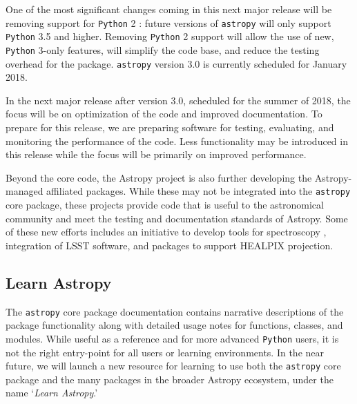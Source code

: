 \documentclass[modern]{aastex61}
\newcommand{\package}[1]{\texttt{#1}\xspace}
\newcommand{\python}{\package{Python}}
\newcommand{\astropy}{Astropy\xspace}
\newcommand{\astropypkg}{\package{astropy}}
\newcommand{\inlinecomment}[2]{\todo[inline]{#1: #2}\xspace}
\begin{document}
One of the most significant changes coming in this next major release will be
removing support for \python 2 \citep{ape10}: future versions of \astropypkg
will only support \python 3.5 and higher.
Removing \python 2 support will allow the use of new, \python 3-only features,
will simplify the code base, and reduce the testing overhead for the package.
\astropypkg version 3.0 is currently scheduled for January 2018.

In the next major release after version 3.0, scheduled for the summer of
2018, the focus will be on optimization of the code and improved
documentation.
To prepare for this release, we are preparing software for testing, evaluating,
and monitoring the performance of the code.
Less functionality may be introduced in this release while the focus will be
primarily on improved performance.

Beyond the core code, the \astropy project is also further developing the
\astropy-managed affiliated packages.
While these may not be integrated into the \astropypkg core package, these
projects provide code that is useful to the astronomical community and meet the
testing and documentation standards of \astropy.
Some of these new efforts includes an initiative to develop tools for
spectroscopy \citep[\package{specutils}, \package{specreduc}, \package{specviz}]
{ape13}, integration of LSST software, and packages to support HEALPIX
projection. %

\subsection{Learn Astropy}

The \astropypkg core package documentation contains narrative descriptions of
the package functionality along with detailed usage notes for functions,
classes, and modules.
While useful as a reference and for more advanced \python users, it is not the
right entry-point for all users or learning environments.
In the near future, we will launch a new resource for learning to use both the
\astropypkg core package and the many packages in the broader \astropy
ecosystem, under the name `\emph{Learn Astropy}.'
\end{document}
